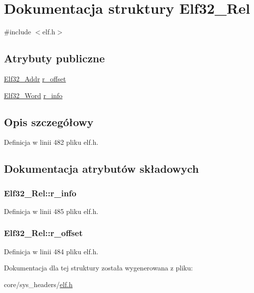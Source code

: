 \hypertarget{struct_elf32___rel}{\section{Dokumentacja struktury Elf32\-\_\-\-Rel}
\label{struct_elf32___rel}
}


{\ttfamily \#include $<$elf.\-h$>$}

\subsection*{Atrybuty publiczne}
\begin{DoxyCompactItemize}
\item 
\hyperlink{elf_8h_a40c6d4571e6001f443cc6a6474620158}{Elf32\-\_\-\-Addr} \hyperlink{struct_elf32___rel_addcf5ef67ababeb4940889e912c11eff}{r\-\_\-offset}
\item 
\hyperlink{elf_8h_af5924ece606c732e86f8263a19408e45}{Elf32\-\_\-\-Word} \hyperlink{struct_elf32___rel_a81c52bb1589056c5d37d58b9bfe2a046}{r\-\_\-info}
\end{DoxyCompactItemize}


\subsection{Opis szczegółowy}


Definicja w linii 482 pliku elf.\-h.



\subsection{Dokumentacja atrybutów składowych}
\hypertarget{struct_elf32___rel_a81c52bb1589056c5d37d58b9bfe2a046}{
\subsubsection[{r\-\_\-info}]{ Elf32\-\_\-\-Rel\-::r\-\_\-info}}\label{struct_elf32___rel_a81c52bb1589056c5d37d58b9bfe2a046}


Definicja w linii 485 pliku elf.\-h.

\hypertarget{struct_elf32___rel_addcf5ef67ababeb4940889e912c11eff}{
\subsubsection[{r\-\_\-offset}]{ Elf32\-\_\-\-Rel\-::r\-\_\-offset}}\label{struct_elf32___rel_addcf5ef67ababeb4940889e912c11eff}


Definicja w linii 484 pliku elf.\-h.



Dokumentacja dla tej struktury została wygenerowana z pliku\-:\begin{DoxyCompactItemize}
\item 
core/sys\-\_\-headers/\hyperlink{elf_8h}{elf.\-h}\end{DoxyCompactItemize}
